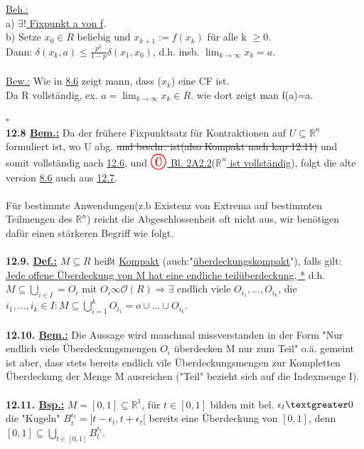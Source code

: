 \documentclass[]{scrartcl}
\newcommand{\redcircle}[1]{%
	\tikz[baseline=(char.base)]{
		\node[shape=circle, draw=red, text=red, thick, inner sep=1pt] (char) 
		{\textbf{#1}};
	}%
}
\newcommand{\bluecircle}[1]{%
	\tikz[baseline=(char.base)]{
		\node[shape=circle, draw=blue, text=blue, thick, inner sep=1pt] (char) 
		{\textbf{#1}};
	}%
}
\begin{document}
	\underline{Beh.:} \\
	a) \ul{$\exists!$ Fixpunkt a von f}.\\
	b) Setze \ul{$x_0 \in R$} beliebig und \ul{$x_{k+1} := f(x_k)$} für alle k $\geq$0.\\
	Dann: \ul{$\delta(x_k,a) \leq \frac{p^k}{1-p}\delta(x_1,x_0)$}, d.h. insb. \ul{$\lim_{k\rightarrow\infty}x_k=a$}.\\
	\\
	\underline{Bew.:} Wie in  \ul{8.6} zeigt mann, dass ($x_k$) eine CF ist.\\
	Da R vollständig, ex. $a=\lim_{k\rightarrow\infty}x_k \in R.$ wie dort zeigt man f(a)=a.\\
	\strut\hfill$\square$\\
	\textbf{12.8 \underline{Bem.:}} Da der frühere Fixpunktsatz für Kontraktionen auf $U \subseteq \mathbb{R}^n$ formuliert ist, wo U abg. \sout{und beschr. ist(also Kompakt nach kap 12.11)} und somit vollständig nach \ul{12.6}, und \ul{$\redcircle{Ü}$ Bl. 2A2.2}(\ul{$\mathbb{R}^n$ ist vollständig}), folgt die alte version  \ul{8.6} auch aus \ul{12.7}.\\
	\\
	Für bestimmte Anwendungen(z.b Existenz von Extrema auf bestimmten Teilmengen des $\mathbb{R}^n$) reicht die Abgeschlossenheit oft nicht aus, wir benötigen dafür einen stärkeren Begriff wie folgt.\\
	\\
	\textbf{12.9. \underline{Def.:}} $M\subseteq R$ heißt \ul{Kompakt} (auch:"\ul{überdeckungskompakt}"), falls gilt: \ul{Jede offene Überdeckung von M hat eine endliche teilüberdeckung, *} d.h. $M\subseteq \bigcup_{i\in I}=O_i$ mit $O_i\infty \mathcal{O}(R)\Rightarrow \exists$ endlich viele $O_{i_1},...,O_{i_k}$, die $i_1,...,i_k  \in I: M\subseteq \bigcup_{i=1}^kO_{i_1}=o\cup ...\cup O_{i_k}.$\\
	\\
	\textbf{12.10. \underline{Bem.:}} Die Aussage \bluecircle{*} wird manchmal missverstanden in der Form "Nur endlich viele Überdeckungsmengen $O_i$ überdecken M nur zum Teil" o.ä. gemeint ist aber, dass stets bereits endlich vile Überdeckungsmengen zur Kompletten Überdeckung der Menge M ausreichen ("Teil" bezieht sich auf die Indexmenge I).\\
	\\
	\textbf{12.11. \underline{Bsp.:}} $M=[0,1]\subseteq \mathbb{R}^1$, für $t\in[0,1]$ bilden mit bel. $\epsilon_t\textgreater0$ die "Kugeln" $B_t^{\epsilon_t}=]t-\epsilon_t, t+\epsilon_t[$ bereits eine Überdeckung von $[0,1]$, denn $[0,1]\subseteq \bigcup_{t\in[0,1]}B_{t}^{\epsilon_t}.$\\
\end{document}
